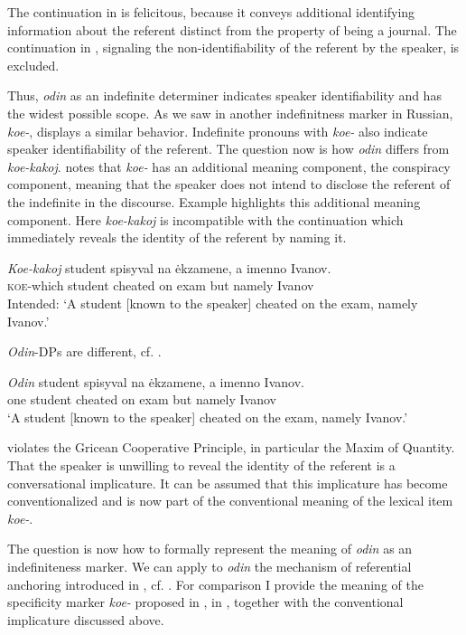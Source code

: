 \documentclass[output=paper,colorlinks,citecolor=brown]{langscibook}
\begin{document}
\noindent The continuation in  is felicitous, because it conveys additional identifying information about the referent distinct from the property of being a journal. The continuation in , signaling the non-identifiability of the referent by the speaker, is excluded. 

Thus, \textit{odin} as an indefinite determiner indicates speaker identifiability and has the widest possible scope. As we saw in  another indefinitness marker in Russian, \textit{koe-}, displays a similar behavior. Indefinite pronouns with \textit{koe-} also indicate speaker identifiability of the referent. The question now is how \textit{odin} differs from \textit{koe-kakoj}. \citet{Paduceva2010} notes that \textit{koe-} has an additional meaning component, the conspiracy component, meaning that the speaker does not intend to disclose the referent of the indefinite in the discourse. Example  highlights this additional meaning component. Here \textit{koe-kakoj} is incompatible with the continuation which immediately reveals the identity of the referent by naming it.

\ea\label{geist:ex:koe-odin1}
\gll \textit{Koe-kakoj} student spisyval na ėkzamene, \minsp{\#} a imenno Ivanov.\\
\textsc{koe}-which student cheated on exam {} but namely Ivanov\\
\glt Intended: ‘A student [known to the speaker] cheated on the exam, namely Ivanov.’
\z

\noindent \textit{Odin}-DPs are different, cf. .

\ea\label{geist:ex:koe-odin2}
\gll \textit{Odin} student spisyval na ėkzamene, a imenno Ivanov.\\
one student cheated on exam but namely Ivanov\\
\glt ‘A student [known to the speaker] cheated on the exam, namely Ivanov.’
\z

\noindent {} violates the Gricean Cooperative Principle, in particular the Maxim of Quantity. That the speaker is unwilling to reveal the identity of the referent is a conversational implicature. It can be assumed that this implicature has become conventionalized and is now part of the conventional meaning of the lexical item \textit{koe-}.

The question is now how to formally represent the meaning of \textit{odin} as an indefiniteness marker. We can apply to \textit{odin} the mechanism of referential anchoring introduced in , cf. . For comparison I provide the meaning of the specificity marker \textit{koe-} proposed in , in , together with the conventional implicature discussed above. 
\end{document}
